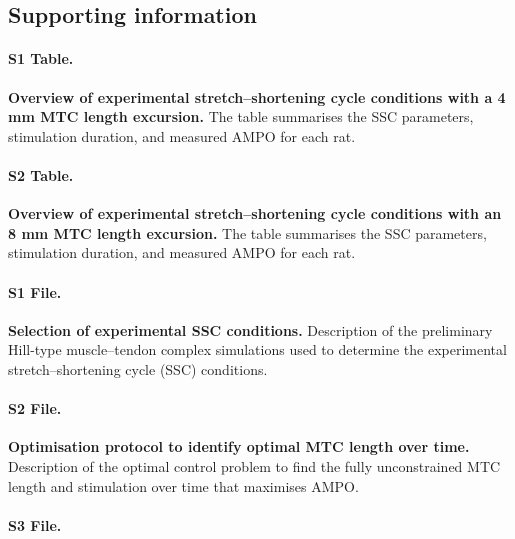 \documentclass[
  10pt,
  letterpaper,
]{article}
\begin{document}
\newpage{}


\subsection*{Supporting information}\label{supporting-information}

\paragraph{S1 Table.}\label{s1-table.}

\label{S1_Table} \textbf{Overview of experimental stretch--shortening
cycle conditions with a 4 mm MTC length excursion.} The table summarises
the SSC parameters, stimulation duration, and measured AMPO for each
rat.

\paragraph{S2 Table.}\label{s2-table.}

\label{S2_Table} \textbf{Overview of experimental stretch--shortening
cycle conditions with an 8 mm MTC length excursion.} The table
summarises the SSC parameters, stimulation duration, and measured AMPO
for each rat.

\paragraph{S1 File.}\label{s1-file.}

\label{S1_File} \textbf{Selection of experimental SSC conditions.}
Description of the preliminary Hill-type muscle--tendon complex
simulations used to determine the experimental stretch--shortening cycle
(SSC) conditions.

\paragraph{S2 File.}\label{s2-file.}

\label{S2_File} \textbf{Optimisation protocol to identify optimal MTC
length over time.} Description of the optimal control problem to find
the fully unconstrained MTC length and stimulation over time that
maximises AMPO.

\paragraph{S3 File.}\label{s3-file.}
\end{document}
